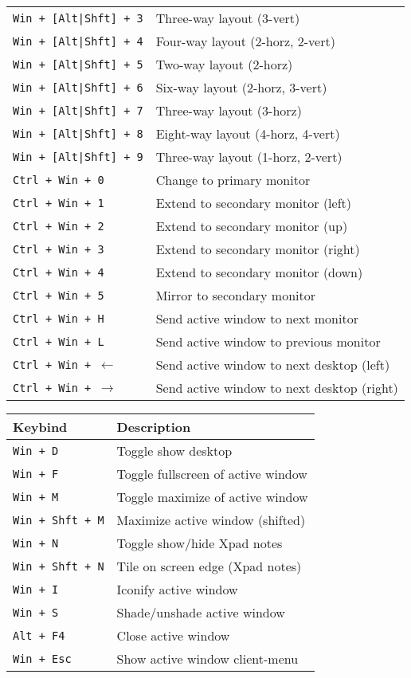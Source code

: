 \documentclass[letterpaper,12pt]{article}
\begin{document}
\begin{table}[H]
\begin{tabular}{|C{5cm}|L{10cm}|}
    {\tt Win + [Alt|Shft] + 3} & Three-way layout (3-vert) \\
    {\tt Win + [Alt|Shft] + 4} & Four-way layout (2-horz, 2-vert) \\
    {\tt Win + [Alt|Shft] + 5} & Two-way layout (2-horz) \\
    {\tt Win + [Alt|Shft] + 6} & Six-way layout (2-horz, 3-vert) \\
    {\tt Win + [Alt|Shft] + 7} & Three-way layout (3-horz) \\
    {\tt Win + [Alt|Shft] + 8} & Eight-way layout (4-horz, 4-vert) \\
    {\tt Win + [Alt|Shft] + 9} & Three-way layout (1-horz, 2-vert) \\
    \hline
    {\tt Ctrl + Win + 0} & Change to primary monitor \\
    {\tt Ctrl + Win + 1} & Extend to secondary monitor (left) \\
    {\tt Ctrl + Win + 2} & Extend to secondary monitor (up) \\
    {\tt Ctrl + Win + 3} & Extend to secondary monitor (right) \\
    {\tt Ctrl + Win + 4} & Extend to secondary monitor (down) \\
    {\tt Ctrl + Win + 5} & Mirror to secondary monitor \\
    {\tt Ctrl + Win + H} & Send active window to next monitor \\
    {\tt Ctrl + Win + L} & Send active window to previous monitor \\
    {\tt Ctrl + Win + $\leftarrow$} & Send active window to next desktop (left) \\
    {\tt Ctrl + Win + $\rightarrow$} & Send active window to next desktop (right) \\
    \hline
  \end{tabular}
\end{table}

\begin{table}[H]
  \begin{tabular}{|C{5cm}|L{10cm}|}
    \hline
    \textbf{Keybind} & \textbf{Description} \\
    \hline
    {\tt Win + D} & Toggle show desktop \\
    {\tt Win + F} & Toggle fullscreen of active window \\
    {\tt Win + M} & Toggle maximize of active window \\
    {\tt Win + Shft + M} & Maximize active window (shifted) \\
    {\tt Win + N} & Toggle show/hide Xpad notes \\
    {\tt Win + Shft + N} & Tile on screen edge (Xpad notes) \\
    {\tt Win + I} & Iconify active window \\
    {\tt Win + S} & Shade/unshade active window \\
    {\tt Alt + F4} & Close active window \\
    {\tt Win + Esc} & Show active window client-menu \\
    \hline
  \end{tabular}
\end{table}
\end{document}
